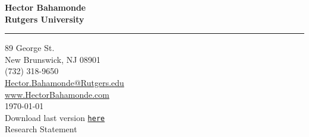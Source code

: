 \documentclass[11pt]{letter} %
\date{}
\begin{document}

\begin{letter}{} 


\begin{center}
\large\bf Hector Bahamonde \\ %
Rutgers University\\
\vspace{20pt} \hrule height 1pt %
89 George St. \\ New Brunswick, NJ 08901 \\ (732) 318-9650 \\ 
{\normalfont\normalsize\href{mailto:hector.bahamonde@rutgers.edu}{Hector.Bahamonde@Rutgers.edu}} \\
{\normalfont\normalsize\href{http://www.hectorbahamonde.com}{www.HectorBahamonde.com}}\\
{\normalfont \scriptsize{
\vspace{4mm}\today\\
Download last version \href{http://github.com/hbahamonde/Job_Market/raw/master/Bahamonde_Research_Statement.pdf}{\texttt{\color{red}here}}}} %
\\
{\huge\vspace{3mm} Research Statement}
\end{center} 


\opening{} 
 

\end{letter}
\end{document}
